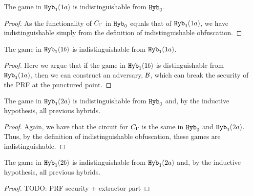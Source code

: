 	\begin{lemma}
		The game in $\texttt{Hyb}_1 (1a)$ is indistinguishable from $\texttt{Hyb}_0$.
		\begin{proof}
			As the functionality of $C_\Gamma$ in $\texttt{Hyb}_0$ equals that of $\texttt{Hyb}_1 (1a)$,
			we have indistinguishable simply from the definition of indistinguishable obfuscation.
		\end{proof}
	\end{lemma}

	\begin{lemma}
		The game in $\texttt{Hyb}_1 (1b)$ is indistinguishable from $\texttt{Hyb}_1 (1a)$.
		\begin{proof}
			Here we argue that if the game in $\texttt{Hyb}_1 (1b)$ is distinguishable from
			$\texttt{Hyb}_1 (1a)$, then we can construct an adversary, $\mathcal{B}$, which can break the security of the PRF
			at the punctured point. 


		\end{proof}
	\end{lemma}

	\begin{lemma}
		The game in $\texttt{Hyb}_1 (2a)$ is indistinguishable from $\texttt{Hyb}_0$ and, by the inductive hypothesis, all previous hybrids.
		\begin{proof}
			Again, we have that the circuit for $C_\Gamma$ is the same in $\texttt{Hyb}_0$ and $\texttt{Hyb}_1 (2a)$.
			Thus, by the definition of indistinguishable obfuscation, these games are indistinguishable.
		\end{proof}
	\end{lemma}

	\begin{lemma}
		The game in $\texttt{Hyb}_1 (2b)$ is indistinguishable from $\texttt{Hyb}_1 (2a)$ and, by the inductive hypothesis, all previous hybrids.
		\begin{proof}
			TODO: PRF security + extractor part
		\end{proof}
	\end{lemma}

	